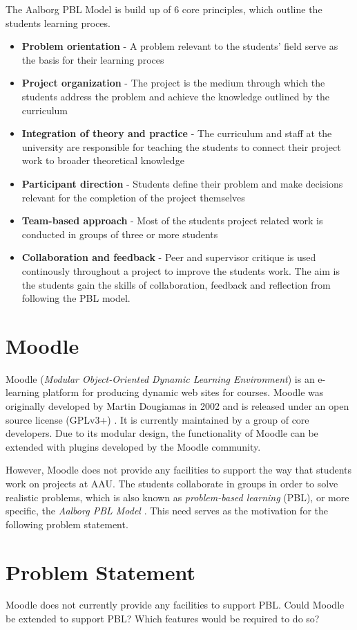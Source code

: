 The Aalborg PBL Model is build up of 6 core principles, which outline the students learning proces.
\begin{itemize}
	\item \textbf{Problem orientation} - A problem relevant to the students' field serve as the basis for their learning proces
	\item \textbf{Project organization} - The project is the medium through which the students address the problem and achieve the knowledge outlined by the curriculum
	\item \textbf{Integration of theory and practice} - The curriculum and staff at the university are responsible for teaching the students to connect their project work to broader theoretical knowledge
	\item \textbf{Participant direction} - Students define their problem and make decisions relevant for the completion of the project themselves
	\item \textbf{Team-based approach} - Most of the students project related work is conducted in groups of three or more students
	\item \textbf{Collaboration and feedback} - Peer and supervisor critique is used continously throughout a project to improve the students work. The aim is the students gain the skills of collaboration, feedback and reflection from following the PBL model. 
\end{itemize}
\section{Moodle}
Moodle (\emph{Modular Object-Oriented Dynamic Learning Environment}) \citep{moodle} is an e-learning platform for producing dynamic web sites for courses. Moodle was originally developed by Martin Dougiamas in 2002 and is released under an open source license (GPLv3+) \citep{gpl}. It is currently maintained by a group of core developers. Due to its modular design, the functionality of Moodle can be extended with plugins developed by the Moodle community.

However, Moodle does not provide any facilities to support the way that students work on projects at AAU. The students collaborate in groups in order to solve realistic problems, which is also known as \emph{problem-based learning} (PBL), or more specific, the \emph{Aalborg PBL Model} \citep{pbl}. This need serves as the motivation for the following problem statement.

\section{Problem Statement}
Moodle does not currently provide any facilities to support PBL. Could Moodle be extended to support PBL? Which features would be required to do so?